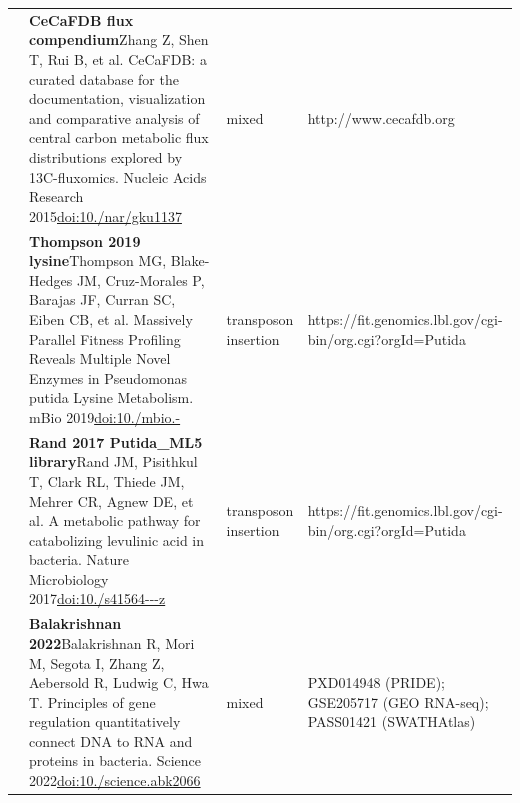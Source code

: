 \begin{landscape}
\begin{longtable}{@{}r@{\hspace{4pt}} L{86mm} L{74mm} L{78mm}@{}}
 & \textbf{CeCaFDB flux compendium}\newline Zhang Z, Shen T, Rui B, et al. CeCaFDB: a curated database for the documentation, visualization and comparative analysis of central carbon metabolic flux distributions explored by 13C-fluxomics. Nucleic Acids Research 2015\newline \href{https://doi.org/10.1093/nar/gku1137}{doi:10./\allowbreak nar/\allowbreak gku1137} & mixed & http:/\allowbreak /\allowbreak www.\allowbreak cecafdb.\allowbreak org \\
 & \textbf{Thompson 2019 lysine}\newline Thompson MG, Blake-Hedges JM, Cruz-Morales P, Barajas JF, Curran SC, Eiben CB, et al. Massively Parallel Fitness Profiling Reveals Multiple Novel Enzymes in Pseudomonas putida Lysine Metabolism. mBio 2019\newline \href{https://doi.org/10.1128/mbio.02577-18}{doi:10./\allowbreak mbio.-} & transposon insertion & https:/\allowbreak /\allowbreak fit.\allowbreak genomics.\allowbreak lbl.\allowbreak gov/\allowbreak cgi-\allowbreak bin/\allowbreak org.\allowbreak cgi?orgId=Putida \\
 & \textbf{Rand 2017 Putida\_ML5 library}\newline Rand JM, Pisithkul T, Clark RL, Thiede JM, Mehrer CR, Agnew DE, et al. A metabolic pathway for catabolizing levulinic acid in bacteria. Nature Microbiology 2017\newline \href{https://doi.org/10.1038/s41564-017-0028-z}{doi:10./\allowbreak s41564---\allowbreak z} & transposon insertion & https:/\allowbreak /\allowbreak fit.\allowbreak genomics.\allowbreak lbl.\allowbreak gov/\allowbreak cgi-\allowbreak bin/\allowbreak org.\allowbreak cgi?orgId=Putida \\
 & \textbf{Balakrishnan 2022}\newline Balakrishnan R, Mori M, Segota I, Zhang Z, Aebersold R, Ludwig C, Hwa T. Principles of gene regulation quantitatively connect DNA to RNA and proteins in bacteria. Science 2022\newline \href{https://doi.org/10.1126/science.abk2066}{doi:10./\allowbreak science.\allowbreak abk2066} & mixed & PXD014948 (PRIDE); GSE205717 (GEO RNA-\allowbreak seq); PASS01421 (SWATHAtlas) \\

\end{longtable}
\end{landscape}
